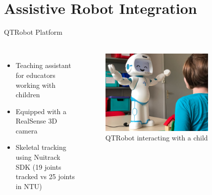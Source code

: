 \documentclass[aspectratio=169, xcolor=dvipsnames]{beamer}
\begin{document}
\section{Assistive Robot Integration}

\begin{frame}{QTRobot Platform}
      \framesubtitle{}%
      
      \begin{columns}
      \vspace{-0.75cm}
      \begin{itemize}
            \item Teaching assistant for educators working with children
            \item Equipped with a RealSense 3D camera
            \item Skeletal tracking using Nuitrack SDK (19 joints tracked vs 25 joints in NTU)
      \end{itemize}

      \begin{figure}[ht!]
            \centering
            \includegraphics[width=0.8\textwidth]{images/qtrobot_with_child.jpeg}
            \caption{QTRobot interacting with a child\footnotemark[8]}
      \end{figure}
      \end{columns}
\end{frame}
\end{document}
